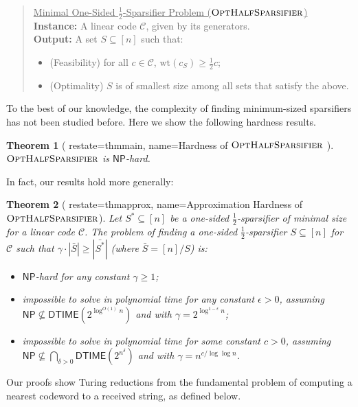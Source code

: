 \documentclass{article}
\newtheorem{theorem}{Theorem}
\newcommand{\NP}{\mathsf{NP}}
\newcommand{\DTIME}{\mathsf{DTIME}}
\newcommand{\OptHalfSparsifier}{\textsc{Opt\-Half\-Sparsifier}}
\newcommand{\calC}{\mathcal{C}}
\newcommand{\wt}{\text{wt}}
\begin{document}
\begin{quote}
    \underline{Minimal One-Sided $\frac12$-Sparsifier Problem ($\OptHalfSparsifier$)}\\
    \textbf{Instance:} A linear code $\calC$,  given by its generators.\\
    \textbf{Output:} A set $S \subseteq [n]$ such that:
    \begin{itemize}
    \item (Feasibility) for all $c \in \calC$, $\wt(c_S) \geq \frac{1}{2}c$;
    \item (Optimality) $S$ is of smallest size among all sets that satisfy the above.
    \end{itemize}
\end{quote}

To the best of our knowledge, the complexity of finding minimum-sized sparsifiers has not been studied before. Here we show the following hardness results.

\begin{theorem}[
        restate=thmmain,
        name=Hardness of $\OptHalfSparsifier$
        ]\label{thm:main}
    $\OptHalfSparsifier$ is $\NP$-hard.
\end{theorem}

In fact, our results hold more generally:

\begin{theorem}[
        restate=thmapprox,
        name=Approximation Hardness of $\OptHalfSparsifier$]\label{thm:approx}
    Let $S^*\subseteq[n]$ be a one-sided $\frac12$-sparsifier of minimal size for a linear code $\calC$. The problem of finding a one-sided $\frac12$-sparsifier $S \subseteq [n]$ for $\calC$ such that $\gamma \cdot |\bar{S}| \geq |\bar{S^*}|$ (where $\bar{S}=[n]/S$) is:
    \begin{itemize}
    \item $\NP$-hard for any constant $\gamma \geq 1$;
    \item impossible to solve in polynomial time for any constant $\epsilon > 0$, assuming $\NP \nsubseteq \DTIME(2^{\log^{O(1)}n})$ and with $\gamma = 2^{\log^{1-\epsilon}n}$;
    \item impossible to solve in polynomial time for some constant $c > 0$, assuming $\NP \nsubseteq \bigcap_{\delta > 0} \DTIME(2^{n^\delta})$ and with $\gamma = n^{c/\log\log n}$.
    \end{itemize}
\end{theorem}

Our proofs show Turing reductions from the fundamental problem of computing a nearest codeword to a received string, as defined below.
\end{document}
